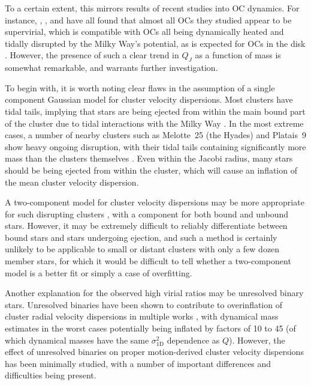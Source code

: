 To a certain extent, this mirrors results of recent studies into OC dynamics. For instance, \cite{bravi_gaia-eso_2018}, \cite{kuhn_kinematics_2019}, and \cite{pang_3d_2021} have all found that almost all OCs they studied appear to be supervirial, which is compatible with OCs all being dynamically heated and tidally disrupted by the Milky Way's potential, as is expected for OCs in the disk \citep{krause_physics_2020}. However, the presence of such a clear trend in $Q_J$ as a function of mass is somewhat remarkable, and warrants further investigation.

To begin with, it is worth noting clear flaws in the assumption of a single component Gaussian model for cluster velocity dispersions. Most clusters have tidal tails, implying that stars are being ejected from within the main bound part of the cluster due to tidal interactions with the Milky Way \citep{meingast_extended_2021,tarricq_structural_2022}. In the most extreme cases, a number of nearby clusters such as Melotte~25 (the Hyades) and Platais~9 show heavy ongoing disruption, with their tidal tails containing significantly more mass than the clusters themselves \citep{oh_kinematic_modelling_2020,meingast_extended_2021}. Even within the Jacobi radius, many stars should be being ejected from within the cluster, which will cause an inflation of the mean cluster velocity dispersion. 

A two-component model for cluster velocity dispersions may be more appropriate for such disrupting clusters \citep[see e.g.][]{kuhn_kinematics_2019}, with a component for both bound and unbound stars. However, it may be extremely difficult to reliably differentiate between bound stars and stars undergoing ejection, and such a method is certainly unlikely to be applicable to small or distant clusters with only a few dozen member stars, for which it would be difficult to tell whether a two-component model is a better fit or simply a case of overfitting.

Another explanation for the observed high virial ratios may be unresolved binary stars. Unresolved binaries have been shown to contribute to overinflation of cluster radial velocity dispersions in multiple works \citep[e.g.][]{gieles_velocity_2010,rastello_effect_binarity_2020}, with dynamical mass estimates in the worst cases potentially being inflated by factors of 10 to 45 (of which dynamical masses have the same $\sigma_\text{1D}^2$ dependence as $Q$). However, the effect of unresolved binaries on proper motion-derived cluster velocity dispersions has been minimally studied, with a number of important differences and difficulties being present.


